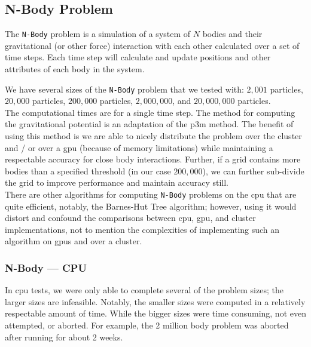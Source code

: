 \subsection{N-Body Problem}

The \texttt{N-Body} problem is a simulation of a system of $N$ bodies and their
gravitational (or other force) interaction with each other calculated over a
set of time steps. Each time step will calculate and update positions and other
attributes of each body in the system.

We have several sizes of the \texttt{N-Body} problem that we tested with:
$2,001$ particles, $20,000$ particles, $200,000$ particles, $2,000,000$, and
$20,000,000$ particles.\\

The computational times are for a single time step. The method for computing
the gravitational potential is an adaptation of the \gls{p3m} method. The
benefit of using this method is we are able to nicely distribute the problem
over the \gls{cluster} and / or over a \gls{gpu} (because of memory
limitations) while maintaining a respectable accuracy for close body
interactions. Further, if a grid contains more bodies than a specified
threshold (in our case $200,000$), we can further sub-divide the grid to
improve performance and maintain accuracy still.\\

There are other algorithms for computing \texttt{N-Body} problems on the
\gls{cpu} that are quite efficient, notably, the Barnes-Hut Tree
algorithm\cite{barneshut1986}; however, using it would distort and confound the
comparisons between \gls{cpu}, \gls{gpu}, and \gls{cluster} implementations,
not to mention the complexities of implementing such an algorithm on
\glspl{gpu} and over a \gls{cluster}.

\subsubsection{N-Body --- CPU}

In \gls{cpu} tests, we were only able to complete several of the problem sizes;
the larger sizes are infeasible. Notably, the smaller sizes were computed in a
relatively respectable amount of time. While the bigger sizes were time
consuming, not even attempted, or aborted. For example, the 2 million body
problem was aborted after running for about 2 weeks.

